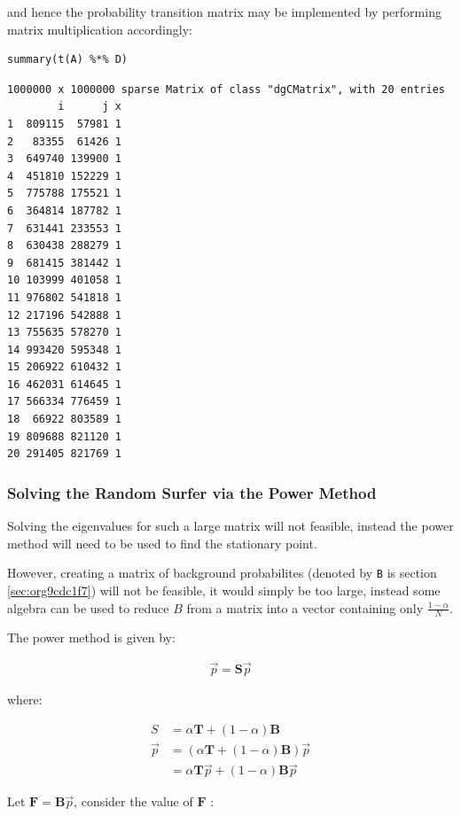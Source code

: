 \documentclass[11pt]{article}
\begin{document}
and hence the probability transition matrix may be implemented by performing matrix multiplication accordingly:

\begin{verbatim}
summary(t(A) %*% D)
\end{verbatim}

\begin{verbatim}
1000000 x 1000000 sparse Matrix of class "dgCMatrix", with 20 entries
        i      j x
1  809115  57981 1
2   83355  61426 1
3  649740 139900 1
4  451810 152229 1
5  775788 175521 1
6  364814 187782 1
7  631441 233553 1
8  630438 288279 1
9  681415 381442 1
10 103999 401058 1
11 976802 541818 1
12 217196 542888 1
13 755635 578270 1
14 993420 595348 1
15 206922 610432 1
16 462031 614645 1
17 566334 776459 1
18  66922 803589 1
19 809688 821120 1
20 291405 821769 1
\end{verbatim}

\subsubsection{Solving the Random Surfer via the Power Method}
\label{sec:org79c1ddc}
Solving the eigenvalues for such a large matrix will not feasible, instead the power method will need to be used to find the stationary point.

However, creating a matrix of background probabilites (denoted by \texttt{B} is section \ref{sec:org9cdc1f7}) will not be feasible, it would simply be too large, instead some algebra can be used to reduce \(B\) from a matrix into a vector containing only \(\frac{1-\alpha}{N}\).

The power method is given by:

\begin{align}
\vec{p}= \mathbf{S} \vec{p}
\end{align}

where:

\begin{align}
S &= \alpha \mathbf{T} +  \left( 1 - \alpha \right) \mathbf{B} \\
\vec{p} &= \left( \alpha \mathbf{T} +  \left( 1 - \alpha \right) \mathbf{B} \right) \vec{p}\\
&= \alpha \mathbf{T}\vec{p} +  \left( 1-\alpha \right) \mathbf{B} \vec{p}
\end{align}

Let \(\mathbf{F}= \mathbf{B}\vec{p}\), consider the value of \(\mathbf{F}\) :
\end{document}
